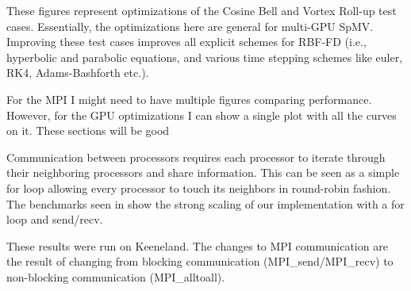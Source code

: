 
These figures represent optimizations of the Cosine Bell and Vortex Roll-up test cases. Essentially, the optimizations here are general for multi-GPU SpMV. Improving these test cases improves all explicit schemes for RBF-FD (i.e., hyperbolic and parabolic equations, and various time stepping schemes like euler, RK4, Adams-Bashforth etc.). 


For the MPI I might need to have multiple figures comparing performance. However, for the GPU optimizations I can show a single plot with all the curves on it. These sections will be good 


Communication between processors requires each processor to iterate through their neighboring processors and share information. This can be seen as a simple for loop allowing every processor to touch its neighbors in round-robin fashion. The benchmarks seen in  show the strong scaling of our implementation with a for loop and send/recv. 


These results were run on Keeneland. The changes to MPI communication are the result of changing from blocking communication (MPI\_send/MPI\_recv) to non-blocking communication (MPI\_alltoall).

